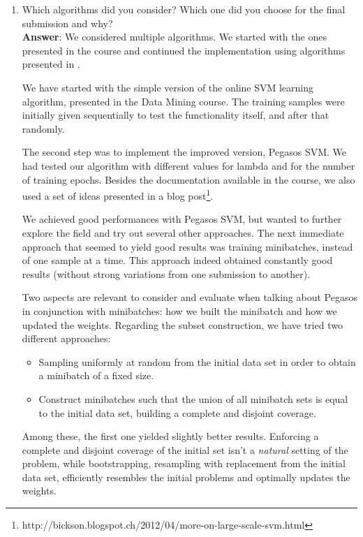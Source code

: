 \documentclass[11pt]{article}
\begin{document}
\begin{enumerate}
\item Which algorithms did you consider? Which one did you choose for the
  final submission and why? \\
  
\textbf{Answer}: We considered multiple algorithms. We started with the
ones presented in the course and continued the implementation using
algorithms presented in \cite{Sculley09}.

We have started with the simple version of the online SVM learning
algorithm, presented in the Data Mining course. The training samples
were initially given sequentially to test the functionality itself, and
after that randomly.

The second step was to implement the improved version, Pegasos SVM. We
had tested our algorithm with different values for lambda and for the number 
of training epochs. 
Besides the documentation available in the course, we also used
a set of ideas presented in a blog post\footnote{
http://bickson.blogspot.ch/2012/04/more-on-large-scale-svm.html}.

We achieved good performances with Pegasos SVM, but wanted to further
explore the field and try out several other approaches. The next
immediate approach that seemed to yield good results was training
minibatches, instead of one sample at a time. This approach indeed
obtained constantly good results (without strong variations from one
submission to another).

Two aspects are relevant to consider and evaluate when talking about
Pegasos in conjunction with minibatches: how we built the minibatch and
how we updated the weights. Regarding the subset construction, we have
tried two different approaches:
\begin{itemize}
\item{Sampling uniformly at random from the initial data set in order
to obtain a minibatch of a fixed size.}
\item{Construct minibatches such that the union of all minibatch sets 
is equal to the initial data set, building a complete and disjoint coverage.}
\end{itemize}

Among these, the first one yielded slightly better results. Enforcing a
complete and disjoint coverage of the initial set isn't a \emph{natural}
setting of the problem, while bootstrapping, resampling with replacement
from the initial data set, efficiently resembles the initial problems
and optimally updates the weights.


\end{enumerate}
\end{document}

